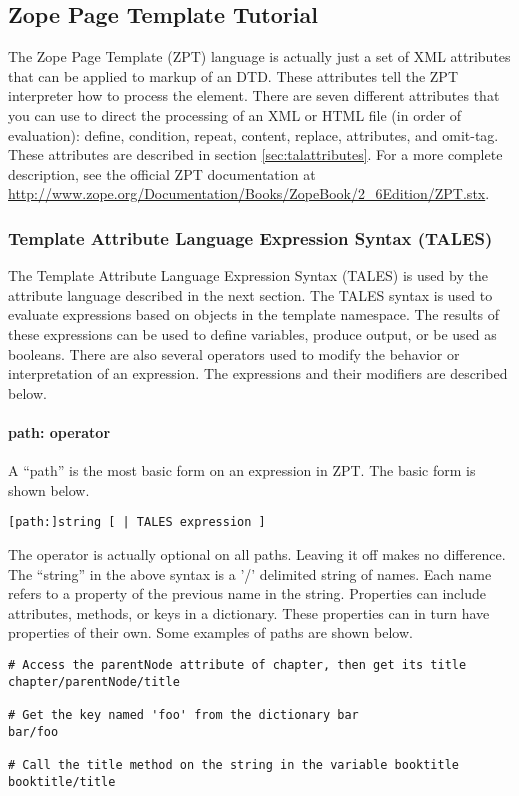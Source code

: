 \subsection{Zope Page Template Tutorial\label{sec:zpttutorial}}

The Zope Page Template (ZPT) language is actually just a set of XML
attributes that can be applied to markup of an DTD.  These attributes
tell the ZPT interpreter how to process the element.  There are 
seven different attributes that you can use to direct the processing
of an XML or HTML file (in order of evaluation): define, condition, repeat, 
content, replace, attributes, and omit-tag.  These attributes are
described in section \ref{sec:talattributes}.  For a more complete description,
see the official ZPT documentation at 
\url{http://www.zope.org/Documentation/Books/ZopeBook/2_6Edition/ZPT.stx}.


\subsubsection{Template Attribute Language Expression Syntax (TALES)}

The Template Attribute Language Expression Syntax (TALES) is used
by the attribute language described in the next section.  The TALES 
syntax is used to evaluate expressions based on objects in the
template namespace.  The results of these expressions can be used to
define variables, produce output, or be used as booleans.  There are
also several operators used to modify the behavior or interpretation
of an expression.  The expressions and their modifiers are described
below.

\paragraph{path: operator\label{sec:pathoperator}}

A ``path'' is the most basic form on an expression in ZPT.  The basic form
is shown below.
\begin{verbatim}
[path:]string [ | TALES expression ]
\end{verbatim}

The  operator is actually optional on all paths.  Leaving it
off makes no difference.  The ``string'' in the above syntax is a '/'
delimited string of names.  Each name refers to a property of the 
previous name in the string.  Properties can include attributes, methods,
or keys in a dictionary.  These properties can in turn have properties
of their own.  Some examples of paths are shown below.
\begin{verbatim}
# Access the parentNode attribute of chapter, then get its title
chapter/parentNode/title

# Get the key named 'foo' from the dictionary bar
bar/foo

# Call the title method on the string in the variable booktitle
booktitle/title
\end{verbatim}

